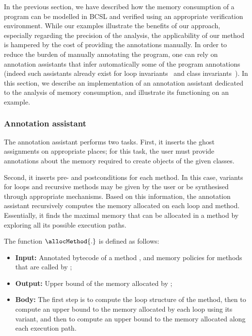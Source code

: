 In the previous section, we have described how the memory consumption
of a program can be modelled in BCSL and verified using an appropriate
verification environment. While our examples illustrate the benefits
of our approach, especially regarding the precision of the analysis,
the applicability of our method is hampered by the cost of providing
the annotations manually. In order to reduce the burden of manually
annotating the program, one can rely on annotation assistants that
infer automatically some of the program annotations (indeed such
assistants already exist for loop invariants~\cite{NimmerE02:ISSTA} and class
invariants~\cite{log04:vmcai}). In this section, we describe an
implementation of an annotation assistant dedicated to the analysis of
memory consumption, and illustrate its functioning on an example.


\subsubsection{Annotation assistant}
The annotation assistant performs two tasks. First, it inserts the
ghost assignments on appropriate places; for this task, the user must
provide annotations about the memory required to create objects of the
given classes. 

Second, it inserts pre- and postconditions for each method. In this case, variants for loops and recursive methods may be given by the user or be
synthesised through appropriate mechanisms.  Based on this
information, the annotation assistant recursively computes the memory
allocated on each loop and method. Essentially, it finds the maximal
memory that can be allocated in a method by exploring all its possible
execution paths.

The function $\allocMethod{.}$ is defined as follows:
\begin{itemize}
\item \textbf{Input:} Annotated bytecode of a method \method, and memory
policies for methods that are called by \method;

\item \textbf{Output:} Upper bound of the memory allocated by \method;

\item \textbf{Body:} The first step is to compute the loop structure
of the method, then to compute an upper bound to the memory allocated
by each loop using its variant, and then to compute an upper bound to
the memory allocated along each execution path.
\end{itemize}



